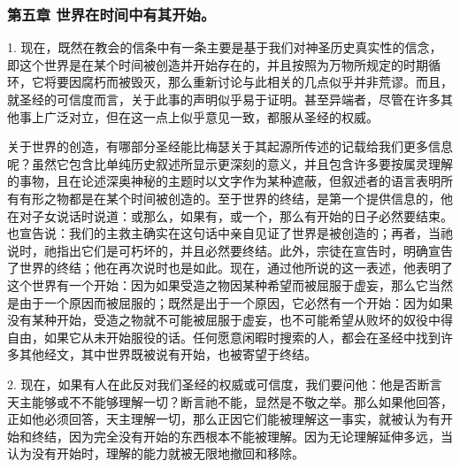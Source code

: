 
\subsubsection{第五章 世界在时间中有其开始。}

1. 现在，既然在教会的信条中有一条主要是基于我们对神圣历史真实性的信念，即这个世界是在某个时间被创造并开始存在的，并且按照为万物所规定的时期循环，它将要因腐朽而被毁灭，那么重新讨论与此相关的几点似乎并非荒谬。而且，就圣经的可信度而言，关于此事的声明似乎易于证明。甚至异端者，尽管在许多其他事上广泛对立，但在这一点上似乎意见一致，都服从圣经的权威。\par

关于世界的创造，有哪部分圣经能比梅瑟关于其起源所传述的记载给我们更多信息呢？虽然它包含比单纯历史叙述所显示更深刻的意义，并且包含许多要按属灵理解的事物，且在论述深奥神秘的主题时以文字作为某种遮蔽，但叙述者的语言表明所有有形之物都是在某个时间被创造的。至于世界的终结，是第一个提供信息的，他在对子女说话时说道：或那么，如果有，或一个，那么有开始的日子必然要结束。也宣告说：我们的主救主确实在这句话中亲自见证了世界是被创造的；再者，当祂说时，祂指出它们是可朽坏的，并且必然要终结。此外，宗徒在宣告时，明确宣告了世界的终结；他在再次说时也是如此。现在，通过他所说的这一表述，他表明了这个世界有一个开始：因为如果受造之物因某种希望而被屈服于虚妄，那么它当然是由于一个原因而被屈服的；既然是出于一个原因，它必然有一个开始：因为如果没有某种开始，受造之物就不可能被屈服于虚妄，也不可能希望从败坏的奴役中得自由，如果它从未开始服役的话。任何愿意闲暇时搜索的人，都会在圣经中找到许多其他经文，其中世界既被说有开始，也被寄望于终结。\par

2. 现在，如果有人在此反对我们圣经的权威或可信度，我们要问他：他是否断言天主能够或不不能够理解一切？断言祂不能，显然是不敬之举。那么如果他回答，正如他必须回答，天主理解一切，那么正因它们能被理解这一事实，就被认为有开始和终结，因为完全没有开始的东西根本不能被理解。因为无论理解延伸多远，当认为没有开始时，理解的能力就被无限地撤回和移除。\par

